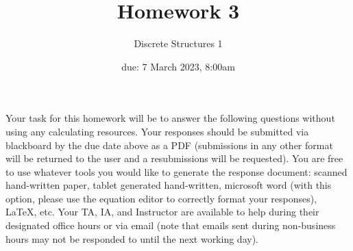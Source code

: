 \documentclass[11pt, oneside]{article}   	%
\title{Homework 3}
\author{Discrete Structures 1}
\date{due: 7 March 2023, 8:00am}							%
\begin{document}
\maketitle

Your task for this homework will be to answer the following questions without using any calculating resources. 
Your responses should be submitted via blackboard by the due date above as a PDF (submissions in any other format will be returned to the user and a resubmissions will be requested). 
You are free to use whatever tools you would like to generate the response document: 
scanned hand-written paper, 
tablet generated hand-written, 
microsoft word (with this option, please use the equation editor to correctly format your responses), 
\LaTeX, etc.
Your TA, IA, and Instructor are available to help during their designated office hours or via email 
(note that emails sent during non-business hours may not be responded to until the next working day). 
\end{document}
